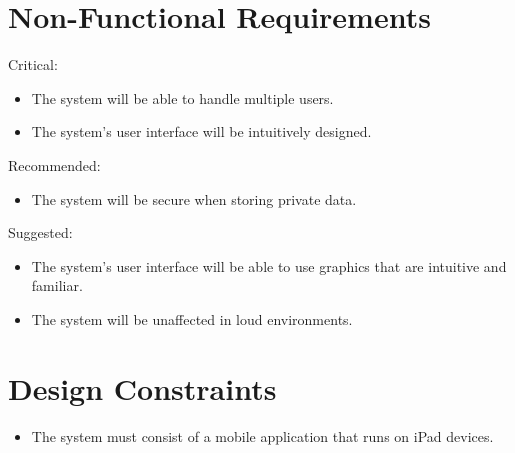 \section{Non-Functional Requirements}
Critical:
\begin{itemize}
\item The system will be able to handle multiple users.
\item The system's user interface will be intuitively designed.
\end{itemize}
Recommended:
\begin{itemize}
\item The system will be secure when storing private data.
\end{itemize}
Suggested:
\begin{itemize}
\item The system's user interface will be able to use graphics that are intuitive and familiar.
\item The system will be unaffected in loud environments.
\end{itemize}

\section{Design Constraints}
\begin{itemize}
\item The system must consist of a mobile application that runs on iPad devices.
\end{itemize}